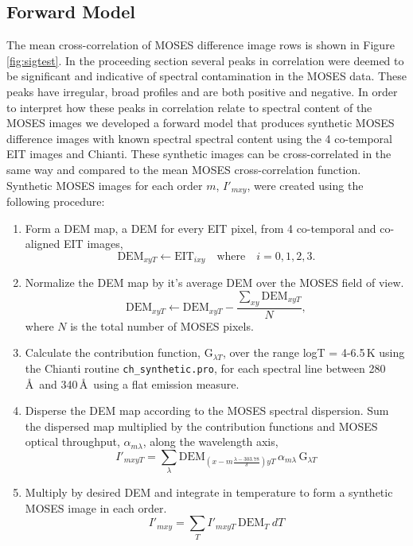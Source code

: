 	\subsection{Forward Model}\label{sec:fomod}
		The mean cross-correlation of MOSES difference image rows is shown in Figure \ref{fig:sigtest}.  
		In the proceeding section  several peaks in correlation were deemed to be significant and indicative of spectral contamination in the MOSES  data.  
		These peaks have irregular, broad profiles and are both positive and negative.  
		In order to interpret how these peaks in correlation relate to spectral content of the MOSES images we developed a forward model that produces synthetic MOSES difference images with known spectral spectral content using the 4 co-temporal EIT images and Chianti.
		These synthetic images can be cross-correlated in the same way and compared to the mean MOSES cross-correlation function. 
		Synthetic MOSES images for each order $m$, $I'_{mxy}$, were created using the following procedure:
			\begin{enumerate}
				\item Form a DEM map, a DEM for every EIT pixel, from 4 co-temporal and co-aligned EIT images,
					\begin{equation}
						\text{DEM}_{xyT} \leftarrow \text{EIT}_{ixy} \quad \text{where} \quad i = 0, 1, 2, 3.
					\end{equation}
					
				\item Normalize the DEM map by it's average DEM over the MOSES field of view.
					\begin{equation}
						\text{DEM}_{xyT} \leftarrow \text{DEM}_{xyT} - \frac{\sum_{xy}\text{DEM}_{xyT} }{N}, 
					\end{equation}
				where $N$ is the total number of MOSES pixels.
				
				\item Calculate the contribution function, G$_{\lambda T}$, over the range logT = 4-6.5\,K  using the Chianti routine \texttt{ch\_synthetic.pro}, for each spectral line between 280\,\AA \ and 340\,\AA\ using a flat emission measure.
				
				\item Disperse the DEM map according to the MOSES spectral dispersion. Sum the dispersed map multiplied by the contribution functions and MOSES optical throughput, $\alpha_{m\lambda}$, along the wavelength axis,
					\begin{equation}
						I'_{mxyT} = \sum_{\lambda}\text{DEM}_{(x-m\frac{\lambda - 303.78}{\delta})yT}\, \alpha_{m\lambda} \, \text{G}_{\lambda T}
					\end{equation}	
				
				\item Multiply by desired DEM and integrate in temperature to form a synthetic MOSES image in each order. 
					\begin{equation}
						I'_{mxy} = \sum_{T} I'_{mxyT}\, \text{DEM}_T\ dT
					\end{equation}
			\end{enumerate} 
		
